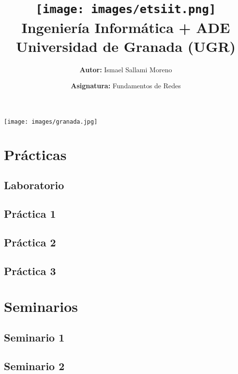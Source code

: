\documentclass[a4paper,12pt]{article}
\title{
    \vspace{-2cm}
    \texttt{[image: images/etsiit.png]} \\ %
    \LARGE Ingeniería Informática + ADE\\
    \large Universidad de Granada (UGR)\\[1cm]
}
\author{\textbf{Autor:} Ismael Sallami Moreno}
\date{\textbf{Asignatura:} Fundamentos de Redes}
\begin{document}
\maketitle
\thispagestyle{empty}

\begin{center}
    \texttt{[image: images/granada.jpg]} \\ %
    \vfill
\end{center}

\newpage

\tableofcontents
\newpage

\section{Prácticas}
\subsection{Laboratorio}


\subsection{Práctica 1}



\subsection{Práctica 2}



\subsection{Práctica 3}


\section{Seminarios}
\subsection{Seminario 1}


\subsection{Seminario 2}

\end{document}
